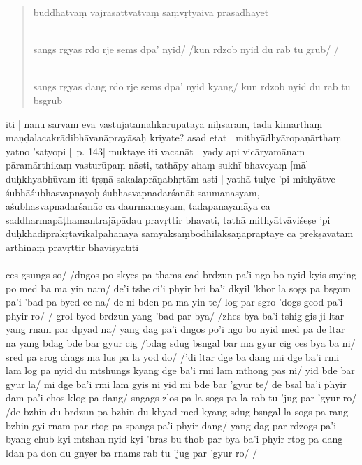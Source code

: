 \documentclass[12pt]{article}
\begin{document}
\begin{quote}
	buddhatvaṃ vajrasattvatvaṃ saṃvṛtyaiva prasādhayet |

	\textbf{\TVA}\\
	sangs rgyas rdo rje sems dpa' nyid/ /kun rdzob nyid du rab tu grub/ /

	\textbf{\TVB}\\
	sangs rgyas dang rdo rje sems dpa' nyid kyang/ kun rdzob nyid du rab tu bsgrub
\end{quote}

iti | nanu sarvam eva vastujātamalīkarūpatayā niḥsāram, tadā kimarthaṃ maṇḍalacakrādibhāvanāprayāsaḥ kriyate? asad etat | mithyādhyāropaṇārthaṃ yatno 'satyopi [\EDD\ p. 143] muktaye iti vacanāt | yady api vicāryamāṇaṃ pāramārthikaṃ vasturūpaṃ nāsti, tathāpy ahaṃ sukhī bhaveyaṃ [mā] duḥkhyabhūvam iti tṛṣṇā sakalaprāṇabhṛtām asti | yathā tulye 'pi mithyātve śubhāśubhasvapnayoḥ śubhasvapnadarśanāt saumanasyam, aśubhasvapnadarśanāc ca daurmanasyam, tadapanayanāya ca saddharmapāṭhamantrajāpādau pravṛttir bhavati, tathā mithyātvāviśeṣe 'pi duḥkhādiprākṛtavikalpahānāya samyaksaṃbodhilakṣaṇaprāptaye ca prekṣāvatām arthināṃ pravṛttir bhaviṣyatīti |\\

\textbf{\TVA}\\
ces gsungs so/ /dngos po skyes pa thams cad brdzun pa'i ngo bo nyid kyis snying po med ba ma yin nam/ de'i tshe ci'i phyir bri ba'i dkyil 'khor la sogs pa bsgom pa'i 'bad pa byed ce na/ de ni bden pa ma yin te/ log par sgro 'dogs gcod pa'i phyir ro/ / grol byed brdzun yang 'bad par bya/ /zhes bya ba'i tshig gis ji ltar yang rnam par dpyad na/ yang dag pa'i dngos po'i ngo bo nyid med pa de ltar na yang bdag bde bar gyur cig /bdag sdug bsngal bar ma gyur cig ces bya ba ni/ sred pa srog chags ma lus pa la yod do/ /'di ltar dge ba dang mi dge ba'i rmi lam log pa nyid du mtshungs kyang dge ba'i rmi lam mthong pas ni/ yid bde bar gyur la/ mi dge ba'i rmi lam gyis ni yid mi bde bar 'gyur te/ de bsal ba'i phyir dam pa'i chos klog pa dang/ sngags zlos pa la sogs pa la rab tu 'jug par 'gyur ro/ /de bzhin du brdzun pa bzhin du khyad med kyang sdug bsngal la sogs pa rang bzhin gyi rnam par rtog pa spangs pa'i phyir dang/ yang dag par rdzogs pa'i byang chub kyi mtshan nyid kyi 'bras bu thob par bya ba'i phyir rtog pa dang ldan pa don du gnyer ba rnams rab tu 'jug par 'gyur ro/ /\\
\end{document}
